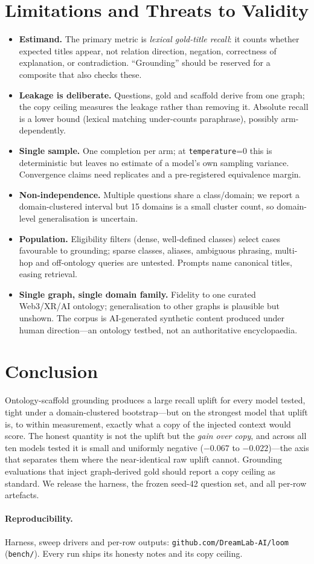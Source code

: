 \documentclass[11pt]{article}
\begin{document}
\section{Limitations and Threats to Validity}\label{sec:limits}
\begin{itemize}[topsep=2pt,itemsep=1pt]
\item \textbf{Estimand.} The primary metric is \emph{lexical gold-title recall}: it counts whether
expected titles appear, not relation direction, negation, correctness of explanation, or
contradiction. ``Grounding'' should be reserved for a composite that also checks these.
\item \textbf{Leakage is deliberate.} Questions, gold and scaffold derive from one graph; the copy
ceiling measures the leakage rather than removing it. Absolute recall is a lower bound (lexical
matching under-counts paraphrase), possibly arm-dependently.
\item \textbf{Single sample.} One completion per arm; at \texttt{temperature}=0 this is
deterministic but leaves no estimate of a model's own sampling variance. Convergence claims need
replicates and a pre-registered equivalence margin.
\item \textbf{Non-independence.} Multiple questions share a class/domain; we report a
domain-clustered interval but 15 domains is a small cluster count, so domain-level generalisation
is uncertain.
\item \textbf{Population.} Eligibility filters (dense, well-defined classes) select cases
favourable to grounding; sparse classes, aliases, ambiguous phrasing, multi-hop and off-ontology
queries are untested. Prompts name canonical titles, easing retrieval.
\item \textbf{Single graph, single domain family.} Fidelity to one curated Web3/XR/AI ontology;
generalisation to other graphs is plausible but unshown. The corpus is AI-generated synthetic
content produced under human direction---an ontology testbed, not an authoritative encyclopaedia.
\end{itemize}

\section{Conclusion}
Ontology-scaffold grounding produces a large recall uplift for every model
tested, tight under a domain-clustered bootstrap---but on the strongest model that uplift is, to
within measurement, exactly what a copy of the injected context would score. The honest quantity is not the uplift but the \emph{gain over
copy}, and across all ten models tested it is small and uniformly negative ($-0.067$ to
$-0.022$)---the axis that separates them where the near-identical raw uplift cannot. Grounding
evaluations that inject graph-derived gold should report a copy ceiling as standard. We release the harness, the frozen seed-42 question set, and all per-row artefacts.

\paragraph{Reproducibility.} Harness, sweep drivers and per-row outputs:
\texttt{github.com/DreamLab-AI/loom} (\texttt{bench/}). Every run ships its honesty notes and its
copy ceiling.

\printbibliography
\end{document}
